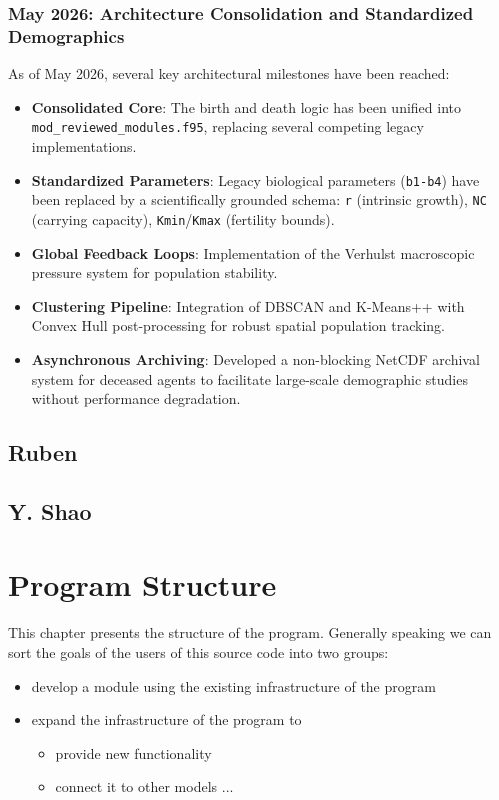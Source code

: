 \documentclass[11pt,a4paper]{article}
\begin{document}
\subsubsection{May 2026: Architecture Consolidation and Standardized Demographics}

As of May 2026, several key architectural milestones have been reached:
\begin{itemize}
    \item \textbf{Consolidated Core}: The birth and death logic has been unified into \texttt{mod\_reviewed\_modules.f95}, replacing several competing legacy implementations.
    \item \textbf{Standardized Parameters}: Legacy biological parameters (\texttt{b1-b4}) have been replaced by a scientifically grounded schema: \texttt{r} (intrinsic growth), \texttt{NC} (carrying capacity), \texttt{Kmin}/\texttt{Kmax} (fertility bounds).
    \item \textbf{Global Feedback Loops}: Implementation of the Verhulst macroscopic pressure system for population stability.
    \item \textbf{Clustering Pipeline}: Integration of DBSCAN and K-Means++ with Convex Hull post-processing for robust spatial population tracking.
    \item \textbf{Asynchronous Archiving}: Developed a non-blocking NetCDF archival system for deceased agents to facilitate large-scale demographic studies without performance degradation.
\end{itemize}

\subsection{Ruben}

\subsection{Y. Shao}

\section{Program Structure}

This chapter presents the structure of the program. Generally speaking we can sort the goals of the users of this source code into two groups: 

\begin{itemize}
    \item develop a module using the existing infrastructure of the program
    \item expand the infrastructure of the program to 
    \begin{itemize}
        \item provide new functionality 
        \item connect it to other models ...
    \end{itemize}
\end{itemize}
\end{document}
